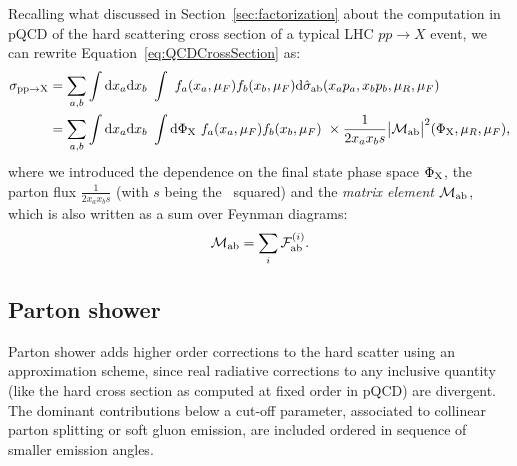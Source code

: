 Recalling what discussed in Section~\ref{sec:factorization} about the computation in pQCD
of the hard scattering cross section of a typical LHC $pp\to X$ event, we can rewrite
Equation~\ref{eq:QCDCrossSection} as:
\begin{equation}
\begin{split}
  \sigma_{{\rm pp}\to{\rm X}}
  & = \sum_{a,b}%
  \int{\rm d}x_a{\rm d}x_b
  ~ \int
  ~ f_a(x_a,\mu_{F}) f_b(x_b,\mu_{F})
  {\rm d}\hat{\sigma}_{\rm ab}(x_ap_a, x_bp_b,\mu_R,\mu_{F}) \\
  & = \sum_{a,b}%
  \int{\rm d}x_a{\rm d}x_b
  ~ \int{\rm d}\Phi_{\rm X}
  ~ f_a(x_a,\mu_{F}) f_b(x_b,\mu_{F})
  ~ \times \dfrac{1}{2x_ax_bs}\big|\mathcal{M}_{\rm ab}\big|^2(\Phi_{\rm X},\mu_R,\mu_{F}),  \\
\end{split}
\label{eq:matrixelement1}
\end{equation}
where we introduced the dependence on the final state phase space $\Phi_{\rm X}$, the parton flux
$\frac{1}{2x_ax_bs}$ (with $s$ being the \cme\ squared) and the {\it matrix element} $\mathcal{M}_{\rm ab}$,
which is also written as a sum over Feynman diagrams:
\begin{equation}\label{eq:matrixelement2}
\mathcal{M}_{\rm ab} = \sum_i \mathcal{F}^{(i)}_{\rm ab}.
\end{equation}




\subsection{Parton shower}\label{sec:partonshower}

Parton shower adds higher order corrections to the hard scatter using an approximation scheme,
since real radiative corrections to any inclusive quantity (like the hard cross section as computed at
fixed order in pQCD) are divergent. The dominant contributions below a cut-off parameter, associated to 
collinear parton splitting or soft gluon emission, are included ordered in sequence of smaller emission angles.

